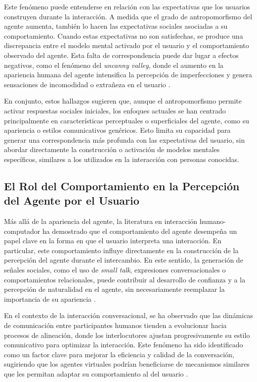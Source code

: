 \documentclass[12pt]{article}
\begin{document}
Este fenómeno puede entenderse en relación con las expectativas que los usuarios construyen durante la interacción. A medida que el grado de antropomorfismo del agente aumenta, también lo hacen las expectativas sociales asociadas a su comportamiento. Cuando estas expectativas no son satisfechas, se produce una discrepancia entre el modelo mental activado por el usuario y el comportamiento observado del agente. Esta falta de correspondencia puede dar lugar a efectos negativos, como el fenómeno del \textit{uncanny valley}, donde el aumento en la apariencia humana del agente intensifica la percepción de imperfecciones y genera sensaciones de incomodidad o extrañeza en el usuario \cite{song_uncanny_2024}.

En conjunto, estos hallazgos sugieren que, aunque el antropomorfismo permite activar respuestas sociales iniciales, los enfoques actuales se han centrado principalmente en características perceptuales o superficiales del agente, como su apariencia o estilos comunicativos genéricos. Esto limita su capacidad para generar una correspondencia más profunda con las expectativas del usuario, sin abordar directamente la construcción o activación de modelos mentales específicos, similares a los utilizados en la interacción con personas conocidas.



\subsection{El Rol del Comportamiento en la Percepción del Agente por el Usuario}

Más allá de la apariencia del agente, la literatura en interacción humano-computador ha demostrado que el comportamiento del agente desempeña un papel clave en la forma en que el usuario interpreta una interacción. En particular, este comportamiento influye directamente en la construcción de la percepción del agente durante el intercambio. En este sentido, la generación de señales sociales, como el uso de \textit{small talk}, expresiones conversacionales o comportamientos relacionales, puede contribuir al desarrollo de confianza y a la percepción de naturalidad en el agente, sin necesariamente reemplazar la importancia de su apariencia \cite{bickmore_relational_2001}.

En el contexto de la interacción conversacional, se ha observado que las dinámicas de comunicación entre participantes humanos tienden a evolucionar hacia procesos de alineación, donde los interlocutores ajustan progresivamente su estilo comunicativo para optimizar la interacción. Este fenómeno ha sido identificado como un factor clave para mejorar la eficiencia y calidad de la conversación, sugiriendo que los agentes virtuales podrían beneficiarse de mecanismos similares que les permitan adaptar su comportamiento al del usuario \cite{thomas_expressions_2020}.
\end{document}
